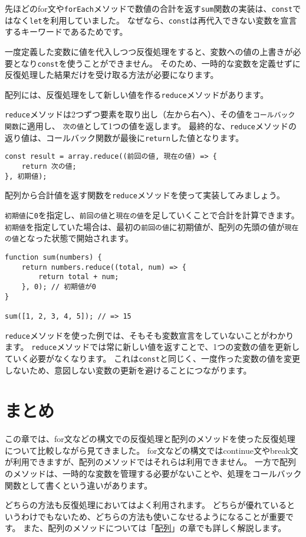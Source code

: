 \begin{tcolorbox}[title=\texttt{let}ではなく\texttt{const}で反復処理をする]\label{const-iteration}

先ほどのfor文や\texttt{forEach}メソッドで数値の合計を返す\texttt{sum}関数の実装は、\texttt{const}ではなく\texttt{let}を利用していました。
なぜなら、\texttt{const}は再代入できない変数を宣言するキーワードであるためです。

一度定義した変数に値を代入しつつ反復処理をすると、変数への値の上書きが必要となり\texttt{const}を使うことができません。
そのため、一時的な変数を定義せずに反復処理した結果だけを受け取る方法が必要になります。

配列には、反復処理をして新しい値を作る\texttt{reduce}メソッドがあります。

\texttt{reduce}メソッドは2つずつ要素を取り出し（左から右へ）、その値を\texttt{コールバック関数}に適用し、
\texttt{次の値}として1つの値を返します。
最終的な、\texttt{reduce}メソッドの返り値は、コールバック関数が最後に\texttt{return}した値となります。

\begin{lstlisting}
const result = array.reduce((前回の値, 現在の値) => {
    return 次の値;
}, 初期値);
\end{lstlisting}

配列から合計値を返す関数を\texttt{reduce}メソッドを使って実装してみましょう。

\texttt{初期値}に\texttt{0}を指定し、\texttt{前回の値}と\texttt{現在の値}を足していくことで合計を計算できます。
\texttt{初期値}を指定していた場合は、最初の\texttt{前回の値}に初期値が、配列の先頭の値が\texttt{現在の値}となった状態で開始されます。

\begin{lstlisting}
function sum(numbers) {
    return numbers.reduce((total, num) => {
        return total + num;
    }, 0); // 初期値が0
}

sum([1, 2, 3, 4, 5]); // => 15
\end{lstlisting}

\texttt{reduce}メソッドを使った例では、そもそも変数宣言をしていないことがわかります。
\texttt{reduce}メソッドでは常に新しい値を返すことで、1つの変数の値を更新していく必要がなくなります。
これは\texttt{const}と同じく、一度作った変数の値を変更しないため、意図しない変数の更新を避けることにつながります。
\end{tcolorbox}

\hypertarget{conclusion}{%
\section{まとめ}\label{conclusion}}

この章では、for文などの構文での反復処理と配列のメソッドを使った反復処理について比較しながら見てきました。
for文などの構文ではcontinue文やbreak文が利用できますが、配列のメソッドではそれらは利用できません。
一方で配列のメソッドは、一時的な変数を管理する必要がないことや、処理をコールバック関数として書くという違いがあります。

どちらの方法も反復処理においてはよく利用されます。
どちらが優れているというわけでもないため、どちらの方法も使いこなせるようになることが重要です。
また、配列のメソッドについては「\hyperlink{array}{配列}」の章でも詳しく解説します。
